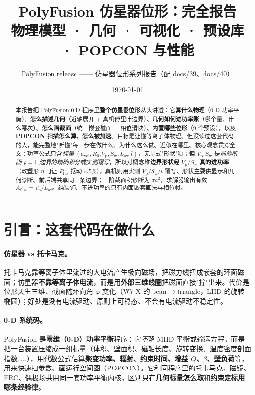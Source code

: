 \documentclass[UTF8,11pt]{ctexart}
\title{\textbf{PolyFusion 仿星器位形：完全报告}\\[2pt]
\large 物理模型 · 几何 · 可视化 · 预设库 · POPCON 与性能}
\author{PolyFusion release —— 仿星器位形系列报告（配 docs/39、docs/40）}
\date{\today}
\newcommand{\Vp}{V_\mathrm{p}}
\newcommand{\Sw}{S_\mathrm{w}}
\newcommand{\Aflux}{A_\mathrm{flux}}
\newcommand{\Lax}{L_\mathrm{ax}}
\newcommand{\Pfus}{P_\mathrm{fus}}
\newcommand{\iotabar}{\bar{\iota}}
\newcommand{\etabar}{\bar\eta}
\begin{document}
\maketitle

\begin{abstract}
本报告把 PolyFusion 0-D 程序里\textbf{整个仿星器位形}从头讲透：它\textbf{算什么物理}（0-D 功率平衡）、\textbf{怎么描述几何}（近轴展开 + 真机傅里叶边界）、\textbf{几何如何进功率账}（哪个量、什么幂次）、\textbf{怎么画截面}（统一嵌套磁面 + 相位滑块）、\textbf{内置哪些位形}（9 个预设），以及 \textbf{POPCON 扫描怎么算、怎么被加速}。目标是让懂等离子体物理、但没读过这套代码的人，能完整地"听懂"每一步在做什么、为什么这么做、近似在哪里。核心观念贯穿全文：功率公式只含\emph{标量} $(a_\mathrm{vol},R_0,\Vp,\Sw,\Lax,\iotabar)$，无显式"形状"项；\textbf{但} $\Vp,\Sw$ 是\emph{前端所画 $\rho{=}1$ 边界的精确积分或实测覆写}，所以对概念堆\textbf{边界形状经 $\Vp/\Sw$ 真的进功率}（改塑形 $\etabar$ 可让 $\Pfus$ 摆动 $\sim5\%$），真机则用实测 $\Vp/\Sw/\iotabar$ 覆写、形状主要供显示和几何诊断。前后端共享同一条边界；一阶截面积诊断为 $\pi a^2$，求解器输出有效 $\Aflux=\Vp/\Lax$。纯装饰、不进功率的只有内面嵌套画法与相位帧。
\end{abstract}

\tableofcontents
\vspace{6pt}

\section{引言：这套代码在做什么}

\paragraph{仿星器 vs 托卡马克。}
托卡马克靠等离子体里流过的大电流产生极向磁场，把磁力线扭成嵌套的环面磁面；仿星器\textbf{不靠等离子体电流}，而是用\textbf{外部三维线圈}把磁面直接"拧"出来。代价是位形天生三维、截面随环向角 $\varphi$ 变化（W7-X 的 bean$\to$triangle，LHD 的旋转椭圆）；好处是没有电流驱动、原则上可稳态、不会有电流驱动不稳定性。

\paragraph{0-D 系统码。}
PolyFusion 是\textbf{零维（0-D）功率平衡}程序：它\emph{不}解 MHD 平衡或输运方程，而是把一台装置压缩成一组标量（体积、壁面积、磁轴长度、旋转变换、温度密度剖面指数……），用代数公式估算\textbf{聚变功率、辐射、约束时间、增益 $Q$、$\beta$、壁负荷}等，用来快速扫参数、画运行空间图（POPCON）。它和同程序里的托卡马克、磁镜、FRC、偶极场共用同一套功率平衡内核，区别只在\textbf{几何标量怎么取}和\textbf{约束定标用哪条经验律}。
\end{document}
